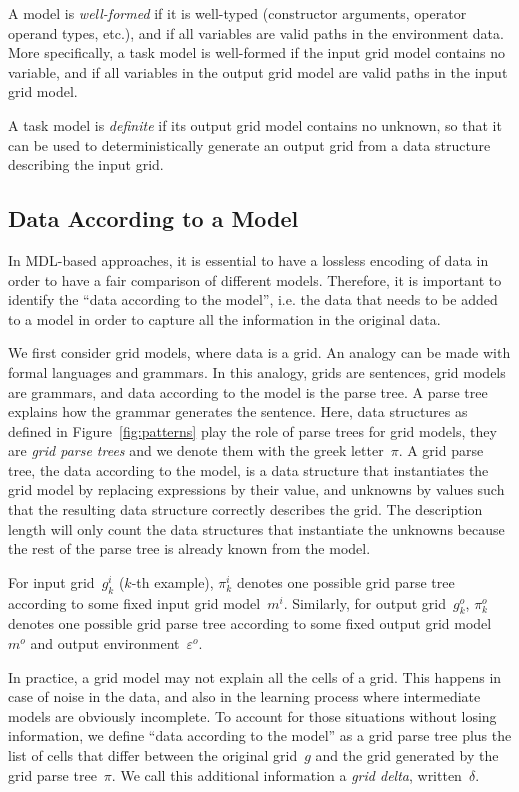 \documentclass[a4paper]{llncs}
\newcommand{\KILL}[1]{}
\newcommand{\nat}{\mathbb{N}}
\begin{document}
A model is {\em well-formed} if it is well-typed (constructor
arguments, operator operand types, etc.), and if all variables are
valid paths in the environment data. More specifically, a task model
is well-formed if the input grid model contains no variable, and if
all variables in the output grid model are valid paths in the input
grid model.

A task model is {\em definite} if its output grid model contains no
unknown, so that it can be used to deterministically generate an
output grid from a data structure describing the input grid.


\subsection{Data According to a Model}
\label{data}

In MDL-based approaches, it is essential to have a lossless encoding
of data in order to have a fair comparison of different
models. Therefore, it is important to identify the ``data according to
the model'', i.e. the data that needs to be added to a model in order
to capture all the information in the original data.

We first consider grid models, where data is a grid. An analogy can be
made with formal languages and grammars. In this analogy, grids are
sentences, grid models are grammars, and data according to the model
is the parse tree. A parse tree explains how the grammar generates the
sentence. Here, data structures as defined in
Figure~\ref{fig:patterns} play the role of parse trees for grid
models, they are {\em grid parse trees} and we denote them with the
greek letter~$\pi$. A grid parse tree, the data according to the
model, is a data structure that instantiates the grid model by
replacing expressions by their value, and unknowns by values such that
the resulting data structure correctly describes the grid. The
description length will only count the data structures that
instantiate the unknowns because the rest of the parse tree is already
known from the model.

For input grid~$g^i_k$ ($k$-th example), $\pi^i_k$ denotes one
possible grid parse tree according to some fixed input grid
model~$m^i$. Similarly, for output grid~$g^o_k$, $\pi^o_k$ denotes one
possible grid parse tree according to some fixed output grid
model~$m^o$ and output environment~$\varepsilon^o$.

In practice, a grid model may not explain all the cells of a
grid. This happens in case of noise in the data, and also in the
learning process where intermediate models are obviously
incomplete. To account for those situations without losing
information, we define ``data according to the model'' as a grid parse
tree plus the list of cells that differ between the original grid~$g$
and the grid generated by the grid parse tree~$\pi$. We call this
additional information a {\em grid delta}, written~$\delta$.
\KILL{Formally, a grid
delta is a set of triples~$(i,j,c) \in \nat \times \nat \times C$
stating that the cell at coordinates~$(i,j)$ has color~$c$ in~$g$,
which is different from the color specified by~$\pi$.}
\end{document}
